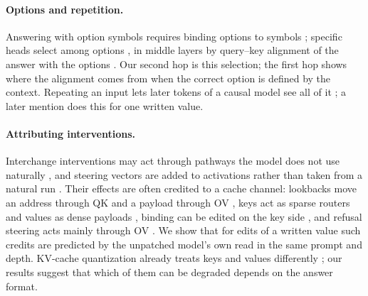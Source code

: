 \paragraph{Options and repetition.}
Answering with option symbols requires binding options to symbols \citep{robinson2023mcsb}; specific heads select among options \citep{lieberum2023chinchilla,wiegreffe2025answer}, in middle layers by query--key alignment of the answer with the options \citep{tulchinskii2024wise}.
Our second hop is this selection; the first hop shows where the alignment comes from when the correct option is defined by the context.
Repeating an input lets later tokens of a causal model see all of it \citep{springer2024echo}; a later mention does this for one written value.

\paragraph{Attributing interventions.}
Interchange interventions \citep{geiger2021inducing,geiger2024finding} may act through pathways the model does not use naturally \citep{makelov2024subspace}, and steering vectors are added to activations rather than taken from a natural run \citep{turner2023actadd,panickssery2023caa}.
Their effects are often credited to a cache channel: lookbacks move an address through QK and a payload through OV \citep{prakash2025lookbacks}, keys act as sparse routers and values as dense payloads \citep{ma2025addressbook}, binding can be edited on the key side \citep{oh2026rebinding}, and refusal steering acts mainly through OV \citep{cheng2026steering}.
We show that for edits of a written value such credits are predicted by the unpatched model's own read in the same prompt and depth.
KV-cache quantization already treats keys and values differently \citep{liu2024kivi}; our results suggest that which of them can be degraded depends on the answer format.
